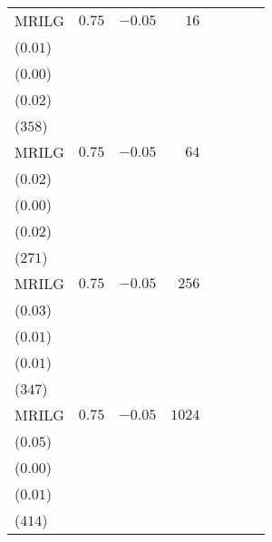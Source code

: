 \begin{table}[t]
\begin{tabular}{lrrrrrrr}
MRILG & \(0.75\) & \(-0.05\) & \(16\) & \longcell{\(0.01\)\\{\tiny(\(0.01\))}} & \longcell{\(0.00\)\\{\tiny(\(0.00\))}} & \longcell{\(0.82\)\\{\tiny(\(0.02\))}} & \longcell{\(6430\)\\{\tiny(\(358\))}} \\[2.2ex]
MRILG & \(0.75\) & \(-0.05\) & \(64\) & \longcell{\(0.04\)\\{\tiny(\(0.02\))}} & \longcell{\(0.00\)\\{\tiny(\(0.00\))}} & \longcell{\(0.83\)\\{\tiny(\(0.02\))}} & \longcell{\(6359\)\\{\tiny(\(271\))}} \\[2.2ex]
MRILG & \(0.75\) & \(-0.05\) & \(256\) & \longcell{\(0.06\)\\{\tiny(\(0.03\))}} & \longcell{\(0.00\)\\{\tiny(\(0.01\))}} & \longcell{\(0.83\)\\{\tiny(\(0.01\))}} & \longcell{\(6161\)\\{\tiny(\(347\))}} \\[2.2ex]
MRILG & \(0.75\) & \(-0.05\) & \(1024\) & \longcell{\(0.05\)\\{\tiny(\(0.05\))}} & \longcell{\(0.00\)\\{\tiny(\(0.00\))}} & \longcell{\(0.82\)\\{\tiny(\(0.01\))}} & \longcell{\(6298\)\\{\tiny(\(414\))}} \\
\bottomrule
\end{tabular}
\end{table}
